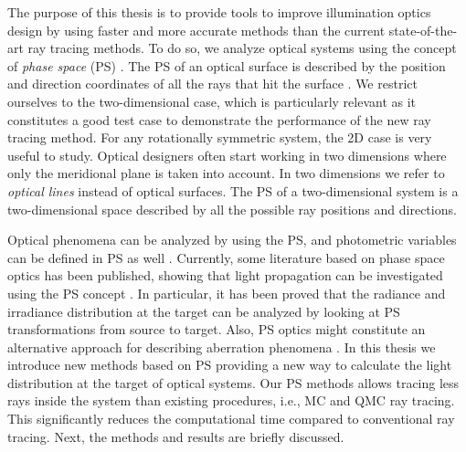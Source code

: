 The purpose of this thesis is to provide tools to improve illumination optics design by using faster and more accurate methods than the current state-of-the-art ray tracing methods.
To do so, we analyze optical systems using the concept of \textit{phase space} (PS) \cite{torre2005linear}.
The PS of an optical surface is described by the position and direction coordinates of all the rays that hit the surface \cite{testorf2009phase}. We restrict ourselves to the two-dimensional case, which is particularly relevant as it constitutes a good test case to
demonstrate the performance of the new ray tracing method. For any rotationally symmetric
system, the 2D case is very useful to study. Optical designers often start working in two dimensions where only the
meridional plane is taken into account. In two dimensions we refer to \textit{optical lines} instead of optical surfaces. The PS of a two-dimensional system is a two-dimensional space described by all the possible ray positions and directions. 

Optical phenomena can be analyzed by using the PS, and photometric variables can be defined in PS as well \cite{rausch2014illumination}.  
Currently, some literature based on phase space optics has been published, showing that light propagation can be investigated using the PS concept \cite{rausch2012phase,rausch2014phase, herkommer2012phase}. 
In particular, it has been proved that the radiance and irradiance distribution at the target can be analyzed by looking at PS transformations from source to target.
Also, PS optics might constitute an alternative approach for describing aberration phenomena \cite{herkommer2013phase, babington2017freeform, wolf1993relativistic}. In this thesis we introduce new methods based on PS providing a new way to calculate the light distribution at the target of optical systems. Our PS methods allows tracing less rays inside the system than existing procedures, i.e., MC and QMC ray tracing. This significantly reduces the computational time compared to conventional ray tracing.
Next, the methods and results are briefly discussed. 
